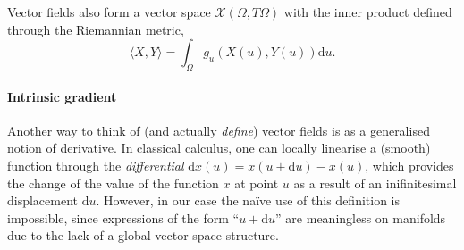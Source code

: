 Vector fields also form a vector space $\mathcal{X}(\Omega, T\Omega)$ with the inner product defined through the Riemannian metric, 
%
\begin{equation}
\langle X, Y \rangle = \int_\Omega g_u(X(u), Y(u)) \mathrm{d}u. \label{eq:inner_vector}   
\end{equation}


\paragraph{Intrinsic gradient}
Another way to think of (and actually {\em define}) vector fields is as a generalised notion of derivative. 
%
In classical calculus, one can locally linearise a (smooth) function through the {\em differential} $\mathrm{d}x(u) = x(u+\mathrm{d}u) - x(u)$, which provides the change of the value of the function $x$ at point $u$ as a result of an inifinitesimal displacement $\mathrm{d}u$. 
%
However, in our case the na{\"i}ve use of this definition is impossible, since 
expressions of the form ``$u+\mathrm{d}u$'' are meaningless on manifolds due to the lack of a global vector space structure. 
%
%





